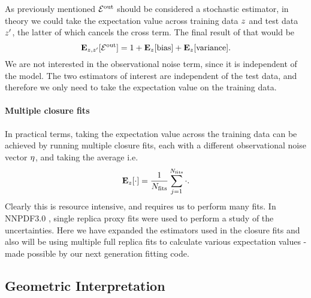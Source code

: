 As previously mentioned $\mathcal{E}^{\rm out}$ should be considered a stochastic estimator, in
theory we could take the expectation value across training data $z$ and
test data $z^{\prime}$, the latter of which cancels the cross term. The
final result of that would be
\begin{equation}\label{eq:ExpectedBiasVariance}
    \mathbf{E}_{z, z^\prime}[\mathcal{E}^{\rm out}] =
    1 + \mathbf{E}_{z}[{\rm bias}] + \mathbf{E}_{z}[{\rm variance}].
\end{equation}
We are not interested in the observational noise term, since it is
independent of the model. The two estimators of interest are independent of
the test data, and therefore we only need to take the expectation value on
the training data.
\paragraph{Multiple closure fits}
In practical terms, taking the expectation value across the training data can
be achieved by running multiple closure fits, each with a different
observational noise vector $\eta$, and taking the average i.e.
\begin{equation}
    \mathbf{E}_{z}[ \cdot ] = \frac{1}{N_{\rm fits}} \sum_{j=1}^{N_{\rm fits}} \cdot.
\end{equation}
Clearly this is resource intensive, and requires us to perform many fits. In
NNPDF3.0 \cite{nnpdf30}, single replica proxy fits were used to perform a study
of the uncertainties. Here we have expanded the estimators used in the closure
fits and also will be using multiple full replica fits to calculate various
expectation values - made possible by our next generation fitting code.

\subsection{Geometric Interpretation}

